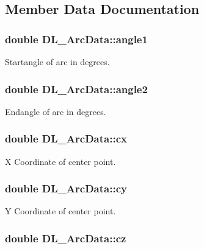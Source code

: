 \subsection{Member Data Documentation}
\hypertarget{structDL__ArcData_ad542e9871ce311f06df735650c8728f2}{
\subsubsection[{angle1}]{\setlength{\rightskip}{0pt plus 5cm}double D\-L\-\_\-\-Arc\-Data\-::angle1}}\label{structDL__ArcData_ad542e9871ce311f06df735650c8728f2}
Startangle of arc in degrees. \hypertarget{structDL__ArcData_a9dd7ac722a92a317aea59d5384fbf94b}{
\subsubsection[{angle2}]{\setlength{\rightskip}{0pt plus 5cm}double D\-L\-\_\-\-Arc\-Data\-::angle2}}\label{structDL__ArcData_a9dd7ac722a92a317aea59d5384fbf94b}
Endangle of arc in degrees. \hypertarget{structDL__ArcData_af6d5aeee348cd30ac9492168088eae6e}{
\subsubsection[{cx}]{\setlength{\rightskip}{0pt plus 5cm}double D\-L\-\_\-\-Arc\-Data\-::cx}}\label{structDL__ArcData_af6d5aeee348cd30ac9492168088eae6e}
X Coordinate of center point. \hypertarget{structDL__ArcData_aba4fee3500acf9c80abafe9fbe99edef}{
\subsubsection[{cy}]{\setlength{\rightskip}{0pt plus 5cm}double D\-L\-\_\-\-Arc\-Data\-::cy}}\label{structDL__ArcData_aba4fee3500acf9c80abafe9fbe99edef}
Y Coordinate of center point. \hypertarget{structDL__ArcData_a178adce6d3782642a588ee9eb2e78208}{
\subsubsection[{cz}]{\setlength{\rightskip}{0pt plus 5cm}double D\-L\-\_\-\-Arc\-Data\-::cz}}\label{structDL__ArcData_a178adce6d3782642a588ee9eb2e78208}
